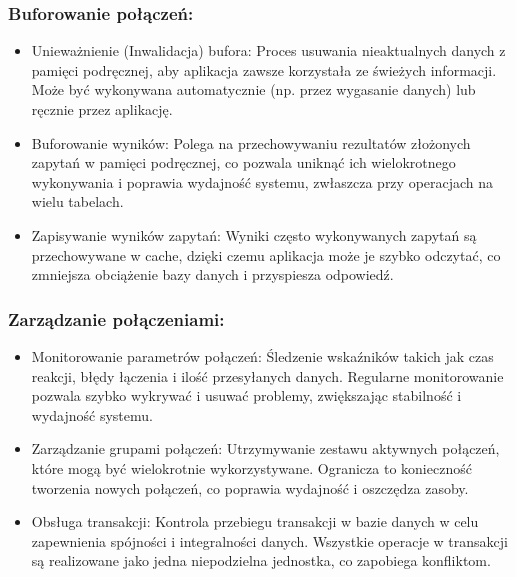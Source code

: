 \documentclass[letterpaper,10pt,polish]{sphinxmanual}
\begin{document}
\subsubsection{Buforowanie połączeń:}
\label{\detokenize{rozdzial2/Wydajnosc_Skalowanie_i_Replikacja/index:buforowanie-polaczen}}\begin{itemize}
\item {} 
\sphinxAtStartPar
Unieważnienie (Inwalidacja) bufora: Proces usuwania nieaktualnych danych z pamięci podręcznej, aby aplikacja zawsze korzystała ze świeżych informacji. Może być wykonywana automatycznie (np. przez wygasanie danych) lub ręcznie przez aplikację.

\item {} 
\sphinxAtStartPar
Buforowanie wyników: Polega na przechowywaniu rezultatów złożonych zapytań w pamięci podręcznej, co pozwala uniknąć ich wielokrotnego wykonywania i poprawia wydajność systemu, zwłaszcza przy operacjach na wielu tabelach.

\item {} 
\sphinxAtStartPar
Zapisywanie wyników zapytań: Wyniki często wykonywanych zapytań są przechowywane w cache, dzięki czemu aplikacja może je szybko odczytać, co zmniejsza obciążenie bazy danych i przyspiesza odpowiedź.

\end{itemize}


\subsubsection{Zarządzanie połączeniami:}
\label{\detokenize{rozdzial2/Wydajnosc_Skalowanie_i_Replikacja/index:zarzadzanie-polaczeniami}}\begin{itemize}
\item {} 
\sphinxAtStartPar
Monitorowanie parametrów połączeń: Śledzenie wskaźników takich jak czas reakcji, błędy łączenia i ilość przesyłanych danych. Regularne monitorowanie pozwala szybko wykrywać i usuwać problemy, zwiększając stabilność i wydajność systemu.

\item {} 
\sphinxAtStartPar
Zarządzanie grupami połączeń: Utrzymywanie zestawu aktywnych połączeń, które mogą być wielokrotnie wykorzystywane. Ogranicza to konieczność tworzenia nowych połączeń, co poprawia wydajność i oszczędza zasoby.

\item {} 
\sphinxAtStartPar
Obsługa transakcji: Kontrola przebiegu transakcji w bazie danych w celu zapewnienia spójności i integralności danych. Wszystkie operacje w transakcji są realizowane jako jedna niepodzielna jednostka, co zapobiega konfliktom.

\end{itemize}
\end{document}
